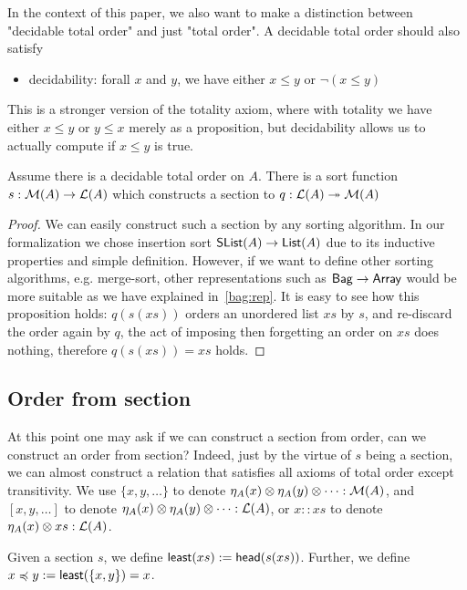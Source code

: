 In the context of this paper, we also want to make a distinction between "decidable total order"
and just "total order". A decidable total order should also satisfy
\begin{itemize}
    \item decidability: forall $x$ and $y$, we have either $x \leq y$ or $\neg(x \leq y)$ 
\end{itemize}

This is a stronger version of the totality axiom, where with totality we have 
either $x \leq y$ or $y \leq x$ merely as a proposition, but decidability allows us to actually
compute if $x \leq y$ is true.

\begin{proposition}
Assume there is a decidable total order on $A$. There is a sort function $s: \mathcal{M}(A) \to \mathcal{L}(A)$
which constructs a section to $q : \mathcal{L}(A) \twoheadrightarrow \mathcal{M}(A)$
\end{proposition}

\begin{proof}
We can easily construct such a section by any sorting algorithm. In our formalization we chose
insertion sort $\operatorname{\mathsf{SList}}(A) \to \operatorname{\mathsf{List}}(A)$ due to its inductive properties and simple definition.
However, if we want to define other sorting algorithms, e.g. merge-sort,
other representations such as $\operatorname{\mathsf{Bag}} \to \operatorname{\mathsf{Array}}$ would be more suitable as we have explained 
in~\cref{bag:rep}.
It is easy to see how this
proposition holds: $q(s(xs))$ orders an unordered list $xs$ by $s$, and re-discard the order again by
$q$, the act of imposing then forgetting an order on $xs$ does nothing, therefore $q(s(xs)) = xs$ holds.
\end{proof}


\subsection{Order from section}
At this point one may ask if we can construct a section from order, can we construct an order from section?
Indeed, just by the virtue of $s$ being a section, we can almost construct a relation that satisfies
all axioms of total order except transitivity.
We use $\{x,y,\dots\}$ to denote $\eta_A(x) \otimes \eta_A(y) \otimes \dots : \mathcal{M}(A)$,
and $[x, y, \dots]$ to denote $\eta_A(x) \otimes \eta_A(y) \otimes \dots : \mathcal{L}(A)$,
or $x :: xs$ to denote $\eta_A(x) \otimes xs : \mathcal{L}(A)$.

\begin{definition}
Given a section $s$, we define $\operatorname{\mathsf{least}}(xs) := \operatorname{\mathsf{head}}(s(xs))$.
Further, we define $x \preccurlyeq y := \operatorname{\mathsf{least}}(\{x, y\}) = x$. 
\end{definition}

